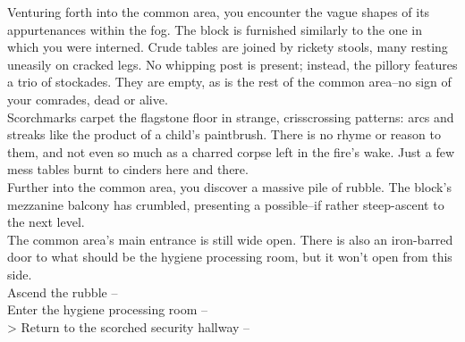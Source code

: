 Venturing forth into the common area, you encounter the vague shapes of its appurtenances within the fog. The block is furnished similarly to the one in which you were interned. Crude tables are joined by rickety stools, many resting uneasily on cracked legs. No whipping post is present; instead, the pillory features a trio of stockades. They are empty, as is the rest of the common area--no sign of your comrades, dead or alive.\\

Scorchmarks carpet the flagstone floor in strange, crisscrossing patterns: arcs and streaks like the product of a child’s paintbrush. There is no rhyme or reason to them, and not even so much as a charred corpse left in the fire’s wake. Just a few mess tables burnt to cinders here and there.\\

Further into the common area, you discover a massive pile of rubble. The block's mezzanine balcony has crumbled, presenting a possible--if rather steep-ascent to the next level.\\

The common area's main entrance is still wide open. There is also an iron-barred door to what should be the hygiene processing room, but it won’t open from this side.\\

 Ascend the rubble -- \\
 Enter the hygiene processing room -- \\
> Return to the scorched security hallway -- 